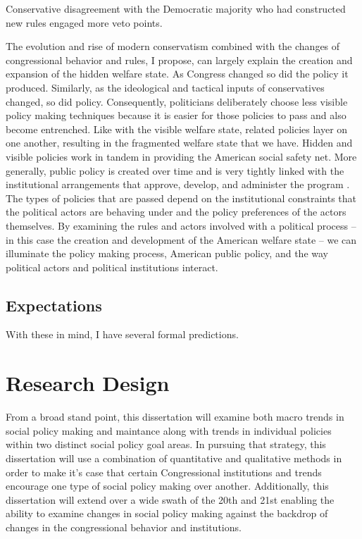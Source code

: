 \documentclass[12pt]{article}
\begin{document}
Conservative disagreement with the Democratic majority who had constructed new rules engaged more veto points.

The evolution and rise of modern conservatism combined with the changes of congressional behavior and rules, I propose, can largely explain the creation and expansion of the hidden welfare state. As Congress changed so did the policy it produced. Similarly, as the ideological and tactical inputs of conservatives changed, so did policy. Consequently, politicians deliberately choose less visible policy making techniques because it is easier for those policies to pass and also become entrenched. Like with the visible welfare state, related policies layer on one another, resulting in the fragmented welfare state that we have. Hidden and visible policies work in tandem in providing the American social safety net. More generally, public policy is created over time and is very tightly linked with the institutional arrangements that approve, develop, and administer the program \citep{pierson2004b}. The types of policies that are passed depend on the institutional constraints that the political actors are behaving under and the policy preferences of the actors themselves. By examining the rules and actors involved with a political process -- in this case the creation and development of the American welfare state -- we can illuminate the policy making process, American public policy, and the way political actors and political institutions interact.

\subsection{Expectations}

With these in mind, I have several formal predictions. 


\section{Research Design}

From a broad stand point, this dissertation will examine both macro trends in social policy making and maintance along with trends in individual policies within two distinct social policy goal areas. In pursuing that strategy, this dissertation will use a combination of quantitative and qualitative methods in order to make it's case that certain Congressional institutions and trends encourage one type of social policy making over another. Additionally, this dissertation will extend over a wide swath of the 20th and 21st enabling the ability to examine changes in social policy making against the backdrop of changes in the congressional behavior and institutions.
\end{document}
